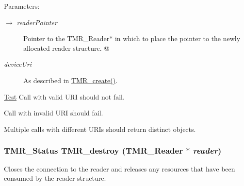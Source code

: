 \begin{Desc}
\item[Parameters:]
\begin{description}
\item[\mbox{$\rightarrow$} {\em readerPointer}]Pointer to the TMR\_\-Reader$\ast$ in which to place the pointer to the newly allocated reader structure. @ \item[{\em deviceUri}]As described in \hyperlink{group__reader_g77b9edd8d948ab1e1d9b95bf546cc43e}{TMR\_\-create()}.\end{description}
\end{Desc}
\begin{Desc}
\item[\hyperlink{test__test000002}{Test}]Call with valid URI should not fail. 

Call with invalid URI should fail. 

Multiple calls with different URIs should return distinct objects. \end{Desc}
\hypertarget{group__reader_gc0d51178a7d1d96ea82c8ea87b1697db}{
\subsubsection[{TMR\_\-destroy}]{\setlength{\rightskip}{0pt plus 5cm}TMR\_\-Status TMR\_\-destroy ({\bf TMR\_\-Reader} $\ast$ {\em reader})}}
\label{group__reader_gc0d51178a7d1d96ea82c8ea87b1697db}


Closes the connection to the reader and releases any resources that have been consumed by the reader structure.

